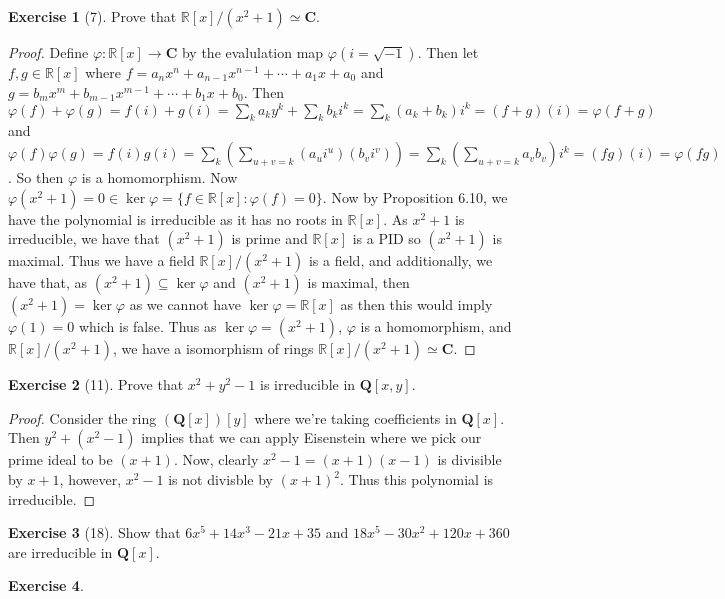 \documentclass[9pt,reqno]{amsart}
\theoremstyle{definition}
\newtheorem{exercise}{Exercise}[section]
\newcommand{\rr}{\mathbb R}
\newcommand{\cc}{\mathbf C}
\newcommand{\qq}{\mathbf Q}
\begin{document}
\begin{exercise}[7] Prove that $ \rr [x] / (x^2+1) \simeq \cc$.
\end{exercise}
\begin{proof}
	Define $\varphi \colon \rr[x] \to \cc$ by the evalulation map $\varphi (i = \sqrt{-1})$. Then let $f, g \in \rr[x]$ where $f = a_n x^n + a_{n-1}x^{n-1} + \cdots + a_1 x + a_0$ and $g = b_mx^m + b_{m-1} x^{m-1} + \cdots + b_1 x+ b_0$. Then $\varphi (f) + \varphi (g) = f (i) + g(i) = \sum_k a_k y^k + \sum_k b_k i^k = \sum_k (a_k + b_k) i^k = (f+g)(i) = \varphi (f+g)$ and $\varphi (f) \varphi (g) = f(i) g(i) = \sum_k (\sum_{u+v= k} (a_u i^u) (b_v i^v)) = \sum_k (\sum_{u+v = k} a_v b_v) i^k = (fg)(i) = \varphi (fg)$. So then $\varphi$ is a homomorphism.  Now $\varphi (x^2 + 1) = 0 \in \ker \varphi = \{ f \in \rr[x] \colon \varphi (f) = 0 \}$. Now by Proposition 6.10, we have the polynomial is irreducible as it has no roots in $\rr[x]$. As $x^2+1$ is irreducible, we have that $(x^2+1)$ is prime and $\rr[x]$ is a PID so $(x^2+1)$ is maximal. Thus we have a field $\rr[x] /(x^2+1)$ is a field, and additionally, we have that, as $(x^2+1) \subseteq \ker \varphi$ and $(x^2+1)$ is maximal, then $(x^2+1) = \ker \varphi$ as we cannot have $\ker \varphi = \rr[x]$ as then this would imply $\varphi (1) = 0$ which is false. Thus as $\ker \varphi = (x^2+1)$, $\varphi $ is a homomorphism, and $\rr[x]/(x^2+1)$, we have a isomorphism of rings  $\rr[x] /(x^2+1) \simeq \cc$. 
\end{proof}
\begin{exercise}[11] Prove that $x^2 + y^2 -1$ is irreducible in $\qq[x, y]$.
\end{exercise}
\begin{proof}
	Consider the ring $(\qq[x])[y]$ where we're taking coefficients in $\qq[x]$. Then $y^2 + (x^2-1)$ implies that we can apply Eisenstein where we pick our prime ideal to be $(x+1)$. Now, clearly $x^2-1 = (x+1)(x-1)$ is divisible by $x+1$, however, $x^2-1$ is not divisble by $(x+1)^2$. Thus this polynomial is irreducible. 
\end{proof}
\begin{exercise}[18] Show that $6x^5 + 14x^3-21x+35$ and $18x^5 -30x^2 +120x+360$ are irreducible in $\qq [x]$.
\end{exercise}

\begin{exercise}
	
\end{exercise}
\end{document}
